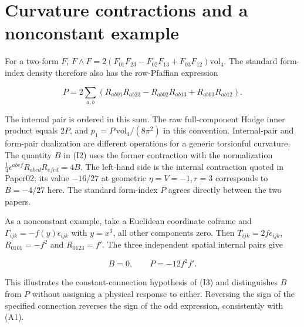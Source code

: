 \section{Curvature contractions and a nonconstant example}

\label{app:B}

For a two-form $F$, $F\wedge F=2(F_{01}F_{23}-F_{02}F_{13}+F_{03}F_{12})\mathrm{vol}_4$. The standard form-index density therefore also has the row-Pfaffian expression

\begin{equation}\tag{B1}\label{eq:B1}
P=2\sum_{a,b}
\left(R_{ab01}R_{ab23}-R_{ab02}R_{ab13}+R_{ab03}R_{ab12}\right).
\end{equation}

The internal pair is ordered in this sum. The raw full-component Hodge inner product equals $2P$, and $p_1=P\,\mathrm{vol}_4/(8\pi^2)$ in this convention. Internal-pair and form-pair dualization are different operations for a generic torsionful curvature. The quantity $B$ in (I2) uses the former contraction with the normalization $\tfrac14\epsilon^{abef}R_{abcd}R_{efcd}=4B$. The left-hand side is the internal contraction quoted in Paper02; its value $-16/27$ at geometric $\eta=V=-1,r=3$ corresponds to $B=-4/27$ here. The standard form-index $P$ agrees directly between the two papers.

As a nonconstant example, take a Euclidean coordinate coframe and $\Gamma_{ijk}=-f(y)\epsilon_{ijk}$ with $y=x^3$, all other components zero. Then $T_{ijk}=2f\epsilon_{ijk}$, $R_{0101}=-f^2$ and $R_{0123}=f'$. The three independent spatial internal pairs give

\begin{equation}\tag{B2}\label{eq:B2}
B=0,\qquad P=-12f^2f'.
\end{equation}

This illustrates the constant-connection hypothesis of (I3) and distinguishes $B$ from $P$ without assigning a physical response to either. Reversing the sign of the specified connection reverses the sign of the odd expression, consistently with (A1).

